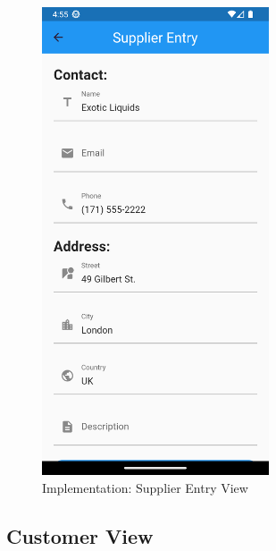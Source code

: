 \documentclass[../thesis.tex]{subfiles}
\begin{document}
\begin{figure}[H]
    \centering
    \includegraphics[width=0.60\textwidth]{images/SupplierScreen_EntryForm.png}
    \caption{Implementation: Supplier Entry View}
    \label{fig:SupplierScreen_EntryForm}
\end{figure}

\subsection{Customer View}
\end{document}
